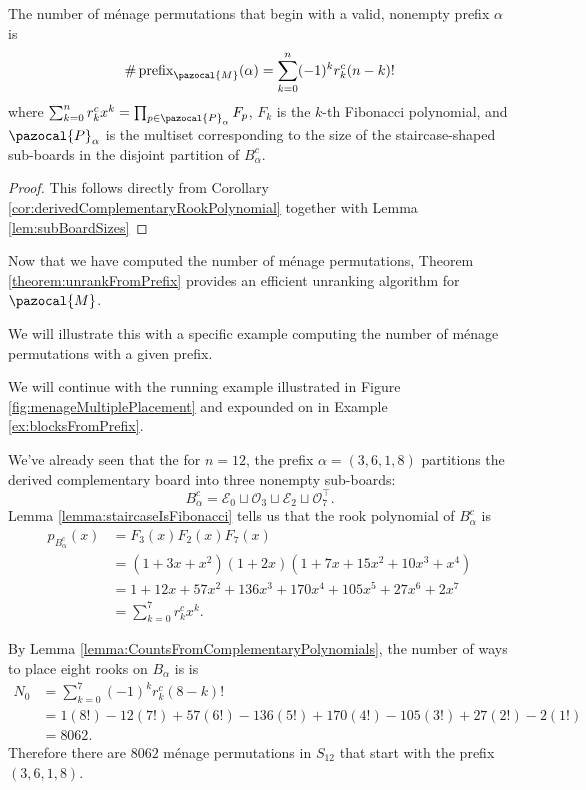 \begin{theorem}
  The number of m\'enage permutations that begin with a valid, nonempty
  prefix $\alpha$ is
  \begin{equation}
    \#\operatorname{prefix}_\pazocal{M}(\alpha) = \sum_{k=0}^{n} (-1)^k r_k^c (n-k)!
  \end{equation} where
  $\sum_{k=0}^n r_k^c x^k = \prod_{p \in \pazocal{P}_\alpha} F_p$,
  $F_k$ is the $k$-th Fibonacci polynomial, and
  $\pazocal{P}_\alpha$ is the multiset corresponding to the size of the staircase-shaped
  sub-boards in the disjoint partition of $B_\alpha^c$.
\end{theorem}
\begin{proof}
  This follows directly from Corollary \ref{cor:derivedComplementaryRookPolynomial}
  together with Lemma \ref{lem:subBoardSizes}
\end{proof}

Now that we have computed the number of m\'enage permutations,
Theorem \ref{theorem:unrankFromPrefix} provides an efficient
unranking algorithm for $\pazocal{M}$.

We will illustrate this with a specific example computing the number of m\'enage
permutations with a given prefix.
\begin{example}
  We will continue with the running example illustrated in
  Figure \ref{fig:menageMultiplePlacement} and expounded on
  in Example \ref{ex:blocksFromPrefix}.

  We've already seen that the for $n = 12$, the prefix $\alpha = (3,6,1,8)$
  partitions the derived complementary board into three nonempty sub-boards: \begin{equation}
    B_\alpha^c = \mathcal{E}_0 \sqcup \mathcal{O}_3 \sqcup \mathcal{E}_2 \sqcup \mathcal{O}_7^\intercal.
  \end{equation} Lemma \ref{lemma:staircaseIsFibonacci} tells us that the rook polynomial of
  $B_\alpha^c$ is \begin{align}
    p_{B_\alpha^c}(x)
    &= F_3(x)F_2(x)F_7(x) \\
    &= (1 + 3x + x^2)(1 + 2x)(1 + 7x + 15x^2 + 10x^3 + x^4) \\
    &= 1 + 12 x + 57 x^2 + 136 x^3 + 170 x^4 + 105 x^5 + 27 x^6 + 2 x^7 \\
    &= \sum_{k=0}^7 r_k^c x^k.
  \end{align}

  By Lemma \ref{lemma:CountsFromComplementaryPolynomials},
  the number of ways to place eight rooks on $B_\alpha$ is
  is \begin{align}
    N_0
      &= \sum_{k=0}^{7} (-1)^k r_k^c (8-k)! \\
      &= 1(8!) - 12(7!) + 57(6!) - 136(5!) + 170(4!) - 105(3!) + 27(2!) - 2(1!) \\
      &= 8062.
  \end{align}
  Therefore there are $8062$ m\'enage permutations in $S_{12}$ that start with
  the prefix $(3,6,1,8)$.
\end{example}

